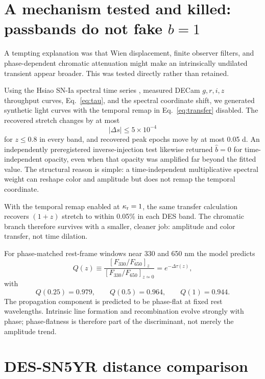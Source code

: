\documentclass[11pt]{article}
\newcommand{\kreact}{\kappa_{\rm r}}
\begin{document}
\section{A mechanism tested and killed: passbands do not fake $b=1$}
A tempting explanation was that Wien displacement, finite observer filters, and phase-dependent chromatic attenuation might make an intrinsically undilated transient appear broader. This was tested directly rather than retained.

Using the Hsiao SN-Ia spectral time series \citep{Hsiao2007}, measured DECam $g,r,i,z$ throughput curves, Eq.~\eqref{eq:tau}, and the spectral coordinate shift, we generated synthetic light curves with the temporal remap in Eq.~\eqref{eq:transfer} disabled. The recovered stretch changes by at most
\begin{equation}
 |\Delta s|\le5\times10^{-4}
\end{equation}
for $z\le0.8$ in every band, and recovered peak epochs move by at most 0.05 d. An independently preregistered inverse-injection test likewise returned $\hat b=0$ for time-independent opacity, even when that opacity was amplified far beyond the fitted value. The structural reason is simple: a time-independent multiplicative spectral weight can reshape color and amplitude but does not remap the temporal coordinate.

With the temporal remap enabled at $\kreact=1$, the same transfer calculation recovers $(1+z)$ stretch to within 0.05\% in each DES band. The chromatic branch therefore survives with a smaller, cleaner job: amplitude and color transfer, not time dilation.

For phase-matched rest-frame windows near 330 and 650 nm the model predicts
\begin{equation}
 Q(z)\equiv\frac{[F_{330}/F_{650}]_z}{[F_{330}/F_{650}]_{z\simeq0}}
 =e^{-\Delta\tau(z)},
\end{equation}
with
\begin{equation}
 Q(0.25)=0.979,\qquad Q(0.5)=0.964,\qquad Q(1)=0.944.
 \label{eq:Q}
\end{equation}
The propagation component is predicted to be phase-flat at fixed rest wavelengths. Intrinsic line formation and recombination evolve strongly with phase; phase-flatness is therefore part of the discriminant, not merely the amplitude trend.

\section{DES-SN5YR distance comparison}
\end{document}
